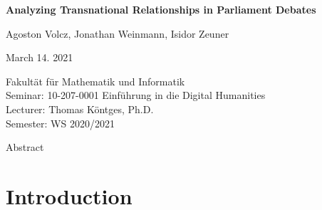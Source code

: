 \documentclass[
  12pt,
]{scrreprt}
\author{}
\date{\vspace{-2.5em}}
\begin{document}
\begin{titlepage}
\centering
\vfill{}
 \par
\vspace{3cm}
{\bfseries\huge Analyzing Transnational Relationships in Parliament Debates \par}
\vspace{1cm}
{\large Agoston Volcz, Jonathan Weinmann, Isidor Zeuner \par
March 14. 2021}

\vfill
Fakultät für Mathematik und Informatik \\
Seminar: 10-207-0001 Einführung in die Digital Humanities \\
Lecturer: Thomas Köntges, Ph.D. \\
Semester: WS 2020/2021


\end{titlepage}
\setcounter{page}{1}
\tableofcontents

Abstract

\hypertarget{introduction}{%
\chapter{Introduction}\label{introduction}}
\end{document}
